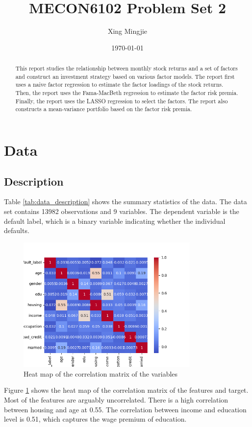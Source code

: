\documentclass[10pt]{article} %
\title{MECON6102 Problem Set 2}
\author{Xing Mingjie}
\date{\today} %
\begin{document}
\maketitle


\begin{abstract}
    This report studies the relationship between monthly stock returns and a set of factors and construct an investment strategy based on various factor models. The report first uses a naive factor regression to estimate the factor loadings of the stock returns. Then, the report uses the Fama-MacBeth regression to estimate the factor risk premia. Finally, the report uses the LASSO regression to select the factors. The report also constructs a mean-variance portfolio based on the factor risk premia.
\end{abstract}

\section{Data}
    \subsection{Description}
    

    Table \ref{tab:data_description} shows the summary statistics of the data. The data set contains 13982 observations and 9 variables. The dependent variable is the default label, which is a binary variable indicating whether the individual defaults. 

    \begin{figure}
        \centering
        \includegraphics[width=0.8\textwidth]{"../fig/variable_heatmap.png"}
        \caption{Heat map of the correlation matrix of the variables}
        \label{fig:variable_heatmap}
    \end{figure}
    Figure \ref{fig:variable_heatmap} shows the heat map of the correlation matrix of the features and target. Most of the features are arguably uncorrelated. There is a high correlation between housing and age at 0.55. The correlation between income and education level is 0.51, which captures the wage premium of education.
\end{document}
